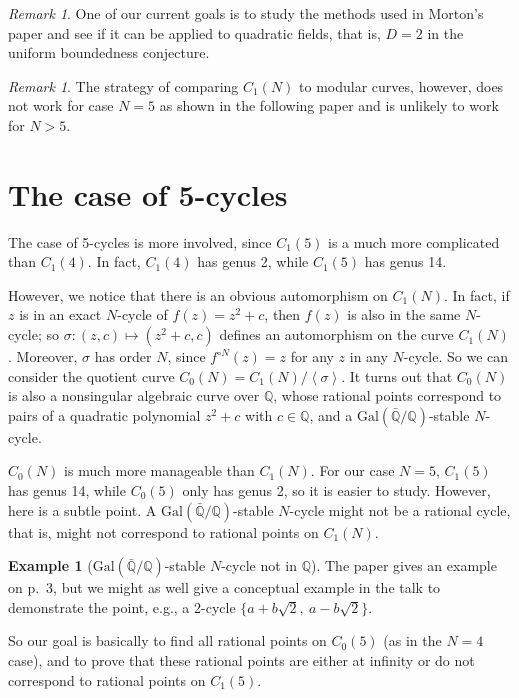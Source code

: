 \documentclass{amsart}
\theoremstyle{plain}
\theoremstyle{definition}
\newtheorem{example}[theorem]{Example}
\theoremstyle{remark}
\newtheorem{remark}[theorem]{Remark}
\newcommand{\Q}{\mathbb{Q}}
\newcommand{\gal}{\mathrm{Gal}}
\newcommand{\tup}[1]{\left<#1\right>}
\begin{document}
\begin{remark}
  One of our current goals is to study the methods used in Morton's
  paper and see if it can be applied to quadratic fields, that is, $D
  = 2$ in the uniform boundedness conjecture.
\end{remark}

\begin{remark}
  The strategy of comparing $C_1(N)$ to modular curves, however, does
  not work for case $N = 5$ as shown in the following paper and is
  unlikely to work for $N > 5$.
\end{remark}



\section{The case of 5-cycles}

The case of 5-cycles is more involved, since $C_1(5)$ is a much more
complicated than $C_1(4)$. In fact, $C_1(4)$ has genus 2, while
$C_1(5)$ has genus 14.

However, we notice that there is an obvious automorphism on
$C_1(N)$. In fact, if $z$ is in an exact $N$-cycle of $f(z) = z^2 + c$,
then $f(z)$ is also in the same $N$-cycle; so $\sigma: (z, c) \mapsto
(z^2 + c, c)$ defines an automorphism on the curve $C_1(N)$. Moreover,
$\sigma$ has order $N$, since $f^{\circ N}(z) = z$ for any $z$ in any
$N$-cycle. So we can consider the quotient curve $C_0(N) =
C_1(N)/\tup{\sigma}$. It turns out that $C_0(N)$ is also a nonsingular
algebraic curve over $\Q$, whose rational points correspond to pairs
of a quadratic polynomial $z^2 + c$ with $c \in \Q$, and a
$\gal(\bar{\Q}/\Q)$-stable $N$-cycle.

$C_0(N)$ is much more manageable than $C_1(N)$. For our case $N = 5$,
$C_1(5)$ has genus 14, while $C_0(5)$ only has genus 2, so it is
easier to study. However, here is a subtle point. A
$\gal(\bar{\Q}/\Q)$-stable $N$-cycle might not be a rational cycle,
that is, might not correspond to rational points on $C_1(N)$.

\begin{example}[$\gal(\bar{\Q}/\Q)$-stable $N$-cycle not in $\Q$]
  The paper gives an example on p.~3, but we might as well give a
  conceptual example in the talk to demonstrate the point, e.g., a
  2-cycle $\{a + b \sqrt{2},\ a - b \sqrt{2}\}$.
\end{example}

So our goal is basically to find all rational points on $C_0(5)$ (as
in the $N=4$ case), and to prove that these rational points are either
at infinity or do not correspond to rational points on $C_1(5)$.
\end{document}
